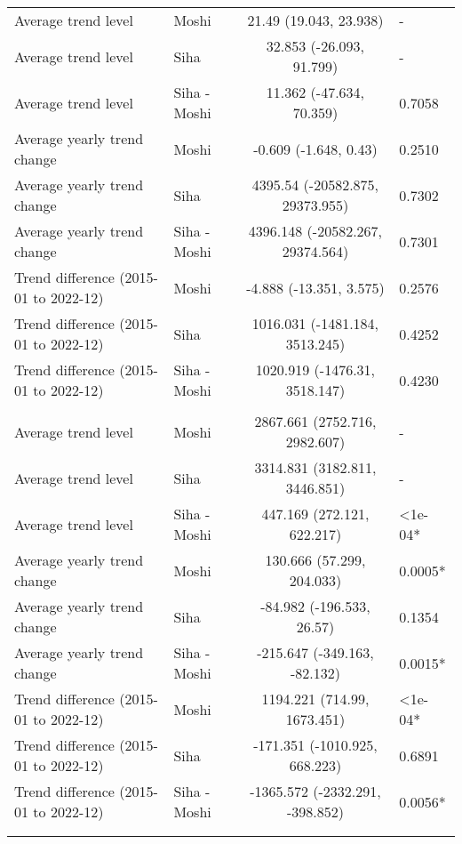 \begin{longtable}{l|lcl}
\midrule\addlinespace[2.5pt]
\multicolumn{4}{l}{Typhoid} \\[2.5pt] 
\midrule\addlinespace[2.5pt]
Average trend level & Moshi & 21.49 (19.043, 23.938) & - \\ 
Average trend level & Siha & 32.853 (-26.093, 91.799) & - \\ 
Average trend level & Siha - Moshi & 11.362 (-47.634, 70.359) & 0.7058 \\ 
Average yearly trend change & Moshi & -0.609 (-1.648, 0.43) & 0.2510 \\ 
Average yearly trend change & Siha & 4395.54 (-20582.875, 29373.955) & 0.7302 \\ 
Average yearly trend change & Siha - Moshi & 4396.148 (-20582.267, 29374.564) & 0.7301 \\ 
Trend difference (2015-01 to 2022-12) & Moshi & -4.888 (-13.351, 3.575) & 0.2576 \\ 
Trend difference (2015-01 to 2022-12) & Siha & 1016.031 (-1481.184, 3513.245) & 0.4252 \\ 
Trend difference (2015-01 to 2022-12) & Siha - Moshi & 1020.919 (-1476.31, 3518.147) & 0.4230 \\ 
\midrule\addlinespace[2.5pt]
\multicolumn{4}{l}{Upper Respiratory Infections} \\[2.5pt] 
\midrule\addlinespace[2.5pt]
Average trend level & Moshi & 2867.661 (2752.716, 2982.607) & - \\ 
Average trend level & Siha & 3314.831 (3182.811, 3446.851) & - \\ 
Average trend level & Siha - Moshi & 447.169 (272.121, 622.217) & <1e-04* \\ 
Average yearly trend change & Moshi & 130.666 (57.299, 204.033) & 0.0005* \\ 
Average yearly trend change & Siha & -84.982 (-196.533, 26.57) & 0.1354 \\ 
Average yearly trend change & Siha - Moshi & -215.647 (-349.163, -82.132) & 0.0015* \\ 
Trend difference (2015-01 to 2022-12) & Moshi & 1194.221 (714.99, 1673.451) & <1e-04* \\ 
Trend difference (2015-01 to 2022-12) & Siha & -171.351 (-1010.925, 668.223) & 0.6891 \\ 
Trend difference (2015-01 to 2022-12) & Siha - Moshi & -1365.572 (-2332.291, -398.852) & 0.0056* \\ 
\midrule\addlinespace[2.5pt]
\multicolumn{4}{l}{Urinary Tract Infections} \\[2.5pt] 
\midrule\addlinespace[2.5pt]

\end{longtable}
